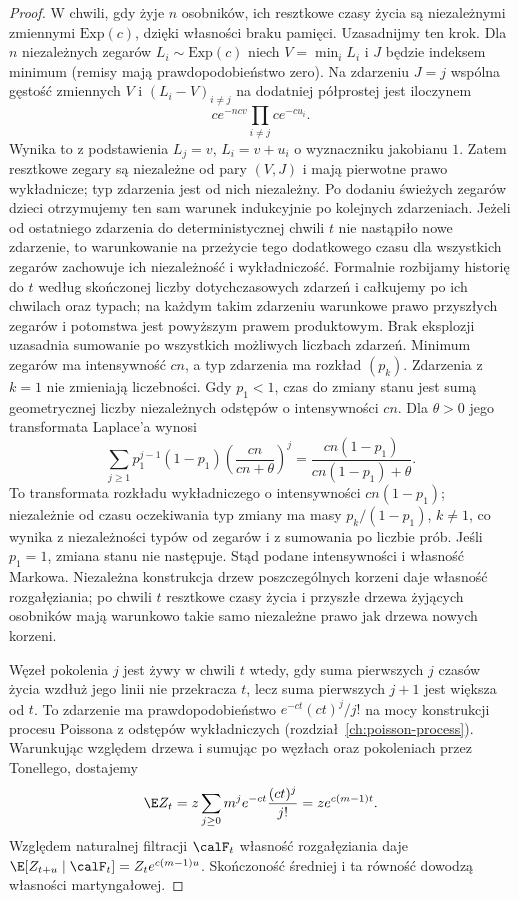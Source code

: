 \begin{proof}
W chwili, gdy żyje $n$ osobników, ich resztkowe
czasy życia są niezależnymi zmiennymi
$\mathrm{Exp}(c)$, dzięki własności braku pamięci.
Uzasadnijmy ten krok. Dla $n$ niezależnych
zegarów $L_i\sim\mathrm{Exp}(c)$ niech
$V=\min_i L_i$ i $J$ będzie indeksem minimum
(remisy mają prawdopodobieństwo zero).
Na zdarzeniu $J=j$ wspólna gęstość zmiennych
$V$ i $(L_i-V)_{i\ne j}$ na dodatniej półprostej
jest iloczynem
\[
c e^{-ncv}\prod_{i\ne j}c e^{-c u_i}.
\]
Wynika to z podstawienia $L_j=v$,
$L_i=v+u_i$ o wyznaczniku jakobianu $1$.
Zatem resztkowe zegary są niezależne od pary
$(V,J)$ i mają pierwotne prawo wykładnicze;
typ zdarzenia jest od nich niezależny.
Po dodaniu świeżych zegarów dzieci otrzymujemy
ten sam warunek indukcyjnie po kolejnych zdarzeniach.
Jeżeli od ostatniego zdarzenia do deterministycznej
chwili $t$ nie nastąpiło nowe zdarzenie, to
warunkowanie na przeżycie tego dodatkowego czasu
dla wszystkich zegarów zachowuje ich niezależność
i wykładniczość. Formalnie rozbijamy historię do
$t$ według skończonej liczby dotychczasowych zdarzeń
i całkujemy po ich chwilach oraz typach;
na każdym takim zdarzeniu warunkowe prawo
przyszłych zegarów i potomstwa jest powyższym
prawem produktowym. Brak eksplozji uzasadnia
sumowanie po wszystkich możliwych liczbach zdarzeń.
Minimum zegarów ma intensywność $cn$, a typ
zdarzenia ma rozkład $(p_k)$. Zdarzenia z $k=1$
nie zmieniają liczebności. Gdy $p_1<1$,
czas do zmiany stanu jest sumą geometrycznej
liczby niezależnych odstępów o intensywności $cn$.
Dla $\theta>0$ jego transformata Laplace'a wynosi
\[
\sum_{j\ge1}p_1^{j-1}(1-p_1)
\left(\frac{cn}{cn+\theta}\right)^j
=\frac{cn(1-p_1)}{cn(1-p_1)+\theta}.
\]
To transformata rozkładu wykładniczego
o intensywności $cn(1-p_1)$; niezależnie od
czasu oczekiwania typ zmiany ma masy
$p_k/(1-p_1)$, $k\ne1$, co wynika z niezależności
typów od zegarów i z sumowania po liczbie prób.
Jeśli $p_1=1$, zmiana stanu nie następuje.
Stąd podane intensywności i własność Markowa.
Niezależna konstrukcja drzew poszczególnych
korzeni daje własność rozgałęziania; po chwili
$t$ resztkowe czasy życia i przyszłe drzewa
żyjących osobników mają warunkowo takie samo
niezależne prawo jak drzewa nowych korzeni.

Węzeł pokolenia $j$ jest żywy w chwili $t$
wtedy, gdy suma pierwszych $j$ czasów życia
wzdłuż jego linii nie przekracza $t$, lecz suma
pierwszych $j+1$ jest większa od $t$.
To zdarzenie ma prawdopodobieństwo
$e^{-ct}(ct)^j/j!$ na mocy konstrukcji procesu
Poissona z odstępów wykładniczych
(rozdział~\ref{ch:poisson-process}).
Warunkując względem drzewa i sumując po węzłach
oraz pokoleniach przez Tonellego, dostajemy
\[
\E Z_t=z\sum_{j\ge0}m^j e^{-ct}\frac{(ct)^j}{j!}
=z e^{c(m-1)t}.
\]
Względem naturalnej filtracji $\calF_t$
własność rozgałęziania daje
$\E[Z_{t+u}\mid\calF_t]=Z_t e^{c(m-1)u}$.
Skończoność średniej i ta równość dowodzą
własności martyngałowej.
\end{proof}

